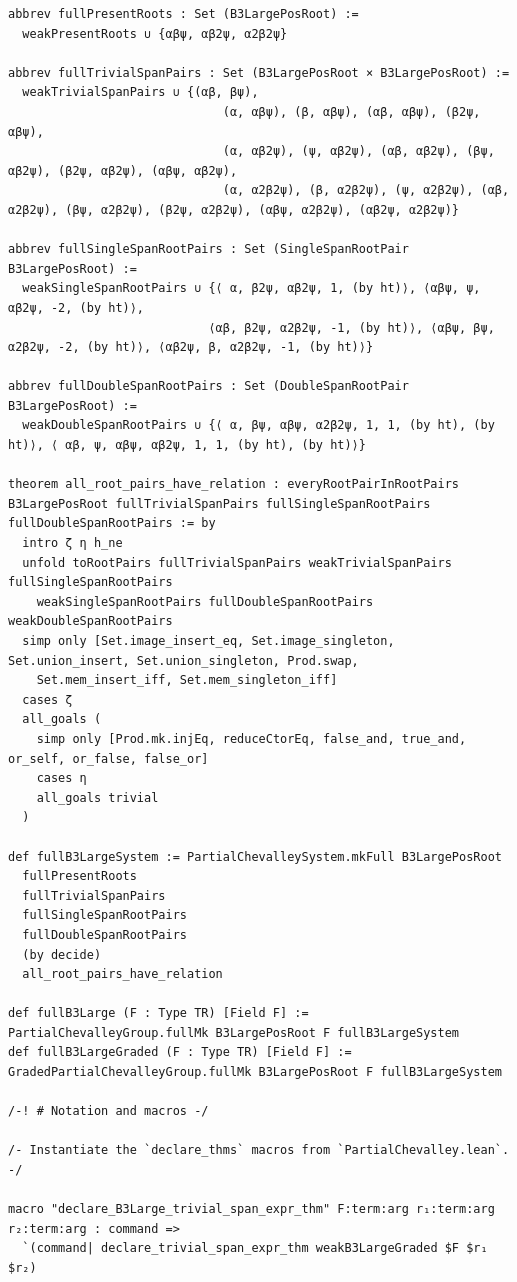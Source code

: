 \documentclass[10pt,a4paper]{article}
\begin{document}
\begin{Verbatim}
abbrev fullPresentRoots : Set (B3LargePosRoot) :=
  weakPresentRoots ∪ {αβψ, αβ2ψ, α2β2ψ}

abbrev fullTrivialSpanPairs : Set (B3LargePosRoot × B3LargePosRoot) :=
  weakTrivialSpanPairs ∪ {(αβ, βψ),
                              (α, αβψ), (β, αβψ), (αβ, αβψ), (β2ψ, αβψ),
                              (α, αβ2ψ), (ψ, αβ2ψ), (αβ, αβ2ψ), (βψ, αβ2ψ), (β2ψ, αβ2ψ), (αβψ, αβ2ψ),
                              (α, α2β2ψ), (β, α2β2ψ), (ψ, α2β2ψ), (αβ, α2β2ψ), (βψ, α2β2ψ), (β2ψ, α2β2ψ), (αβψ, α2β2ψ), (αβ2ψ, α2β2ψ)}

abbrev fullSingleSpanRootPairs : Set (SingleSpanRootPair B3LargePosRoot) :=
  weakSingleSpanRootPairs ∪ {⟨ α, β2ψ, αβ2ψ, 1, (by ht)⟩, ⟨αβψ, ψ, αβ2ψ, -2, (by ht)⟩,
                            ⟨αβ, β2ψ, α2β2ψ, -1, (by ht)⟩, ⟨αβψ, βψ, α2β2ψ, -2, (by ht)⟩, ⟨αβ2ψ, β, α2β2ψ, -1, (by ht)⟩}

abbrev fullDoubleSpanRootPairs : Set (DoubleSpanRootPair B3LargePosRoot) :=
  weakDoubleSpanRootPairs ∪ {⟨ α, βψ, αβψ, α2β2ψ, 1, 1, (by ht), (by ht)⟩, ⟨ αβ, ψ, αβψ, αβ2ψ, 1, 1, (by ht), (by ht)⟩}

theorem all_root_pairs_have_relation : everyRootPairInRootPairs B3LargePosRoot fullTrivialSpanPairs fullSingleSpanRootPairs fullDoubleSpanRootPairs := by
  intro ζ η h_ne
  unfold toRootPairs fullTrivialSpanPairs weakTrivialSpanPairs fullSingleSpanRootPairs
    weakSingleSpanRootPairs fullDoubleSpanRootPairs weakDoubleSpanRootPairs
  simp only [Set.image_insert_eq, Set.image_singleton, Set.union_insert, Set.union_singleton, Prod.swap,
    Set.mem_insert_iff, Set.mem_singleton_iff]
  cases ζ
  all_goals (
    simp only [Prod.mk.injEq, reduceCtorEq, false_and, true_and, or_self, or_false, false_or]
    cases η
    all_goals trivial
  )

def fullB3LargeSystem := PartialChevalleySystem.mkFull B3LargePosRoot
  fullPresentRoots
  fullTrivialSpanPairs
  fullSingleSpanRootPairs
  fullDoubleSpanRootPairs
  (by decide)
  all_root_pairs_have_relation

def fullB3Large (F : Type TR) [Field F] := PartialChevalleyGroup.fullMk B3LargePosRoot F fullB3LargeSystem
def fullB3LargeGraded (F : Type TR) [Field F] := GradedPartialChevalleyGroup.fullMk B3LargePosRoot F fullB3LargeSystem

/-! # Notation and macros -/

/- Instantiate the `declare_thms` macros from `PartialChevalley.lean`. -/

macro "declare_B3Large_trivial_span_expr_thm" F:term:arg r₁:term:arg r₂:term:arg : command =>
  `(command| declare_trivial_span_expr_thm weakB3LargeGraded $F $r₁ $r₂)


\end{Verbatim}
\end{document}
